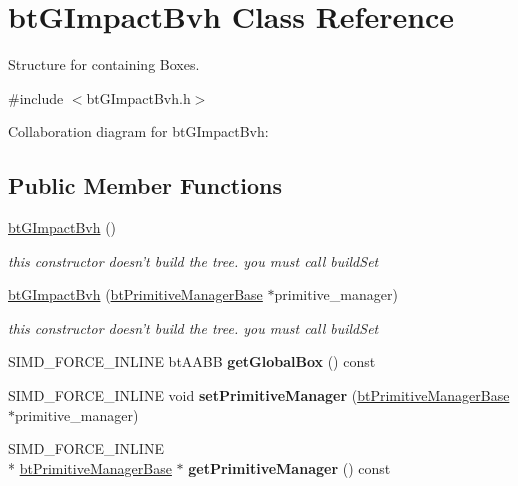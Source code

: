 \hypertarget{classbt_g_impact_bvh}{\section{bt\+G\+Impact\+Bvh Class Reference}
\label{classbt_g_impact_bvh}
}


Structure for containing Boxes.  




{\ttfamily \#include $<$bt\+G\+Impact\+Bvh.\+h$>$}



Collaboration diagram for bt\+G\+Impact\+Bvh\+:
\subsection*{Public Member Functions}
\begin{DoxyCompactItemize}
\item 
\hypertarget{classbt_g_impact_bvh_ab305fcdbd3faf585e253433b7193587e}{\hyperlink{classbt_g_impact_bvh_ab305fcdbd3faf585e253433b7193587e}{bt\+G\+Impact\+Bvh} ()}\label{classbt_g_impact_bvh_ab305fcdbd3faf585e253433b7193587e}

\begin{DoxyCompactList}\small\item\em this constructor doesn't build the tree. you must call build\+Set \end{DoxyCompactList}\item 
\hypertarget{classbt_g_impact_bvh_afbb8405cc5348fc66dc09819bfc60969}{\hyperlink{classbt_g_impact_bvh_afbb8405cc5348fc66dc09819bfc60969}{bt\+G\+Impact\+Bvh} (\hyperlink{classbt_primitive_manager_base}{bt\+Primitive\+Manager\+Base} $\ast$primitive\+\_\+manager)}\label{classbt_g_impact_bvh_afbb8405cc5348fc66dc09819bfc60969}

\begin{DoxyCompactList}\small\item\em this constructor doesn't build the tree. you must call build\+Set \end{DoxyCompactList}\item 
\hypertarget{classbt_g_impact_bvh_a31a23cbd06c37a92289dc8d03585d783}{S\+I\+M\+D\+\_\+\+F\+O\+R\+C\+E\+\_\+\+I\+N\+L\+I\+N\+E bt\+A\+A\+B\+B {\bfseries get\+Global\+Box} () const }\label{classbt_g_impact_bvh_a31a23cbd06c37a92289dc8d03585d783}

\item 
\hypertarget{classbt_g_impact_bvh_a9bf61ff1769af089dd53e2f1a78c8ef8}{S\+I\+M\+D\+\_\+\+F\+O\+R\+C\+E\+\_\+\+I\+N\+L\+I\+N\+E void {\bfseries set\+Primitive\+Manager} (\hyperlink{classbt_primitive_manager_base}{bt\+Primitive\+Manager\+Base} $\ast$primitive\+\_\+manager)}\label{classbt_g_impact_bvh_a9bf61ff1769af089dd53e2f1a78c8ef8}

\item 
\hypertarget{classbt_g_impact_bvh_ad30a9bbe3df5db30c7f73a126b1ff1a3}{S\+I\+M\+D\+\_\+\+F\+O\+R\+C\+E\+\_\+\+I\+N\+L\+I\+N\+E \\*
\hyperlink{classbt_primitive_manager_base}{bt\+Primitive\+Manager\+Base} $\ast$ {\bfseries get\+Primitive\+Manager} () const }\label{classbt_g_impact_bvh_ad30a9bbe3df5db30c7f73a126b1ff1a3}

\end{DoxyCompactItemize}
